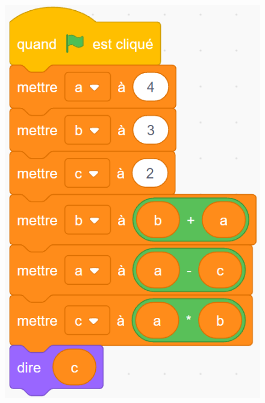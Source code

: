 \documentclass[14pt]{extarticle}
\begin{document}
\begin{figure}[H]
    \centering
    \includegraphics[width=0.5\linewidth]{images/pretest/_Q4.jpg}
\end{figure}
\end{document}

